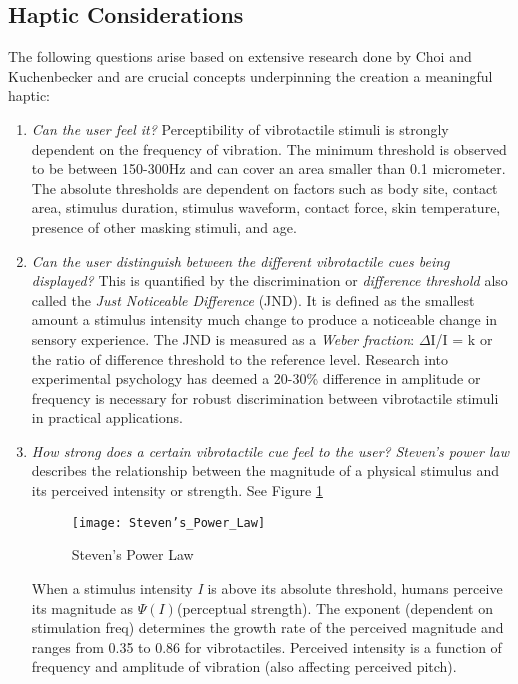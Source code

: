 \subsection{Haptic Considerations} \label{hapticConsiderations}
The following questions arise based on extensive research done by Choi and Kuchenbecker \cite{choi2013vibrotactile} and are crucial concepts underpinning the creation a meaningful haptic:
\begin{enumerate}
    \item \emph{Can the user feel it?}
Perceptibility of vibrotactile stimuli is strongly dependent on the frequency of vibration. The minimum threshold is observed to be between 150-300Hz and can cover an area smaller than 0.1 micrometer. The absolute thresholds are dependent on factors such as body site, contact area, stimulus duration, stimulus waveform, contact force, skin temperature, presence of other masking stimuli, and age.
    \item \emph{Can the user distinguish between the different vibrotactile cues being displayed?}
This is quantified by the discrimination or \textit{difference threshold} also called the \textit{Just Noticeable Difference} (JND). It is defined as the smallest amount a stimulus intensity much change to produce a noticeable change in sensory experience. The JND is measured as a \textit{Weber fraction}:
${\Delta}$I/I = k or the ratio of difference threshold to the reference level.
Research into experimental psychology has deemed a 20-30\% difference in amplitude or frequency is necessary for robust discrimination between vibrotactile stimuli in practical applications.
    \item \emph{How strong does a certain vibrotactile cue feel to the user?}
\textit{Steven's power law} describes the relationship between the magnitude of a physical stimulus and its perceived intensity or strength. See Figure \ref{fig:StevensPowerLaw}
\begin{figure}[H]
    \texttt{[image: Steven's\_Power\_Law]}
    \caption{Steven's Power Law}
    \label{fig:StevensPowerLaw}
\end{figure}
When a stimulus intensity \textit{I} is above its absolute threshold, humans perceive its magnitude as \begin{math}\Psi(I)\end{math}(perceptual strength). The exponent (dependent on stimulation freq) determines the growth rate of the perceived magnitude and ranges from 0.35 to 0.86 for vibrotactiles. Perceived intensity is a function of frequency and amplitude of vibration (also affecting perceived pitch).

\end{enumerate}
